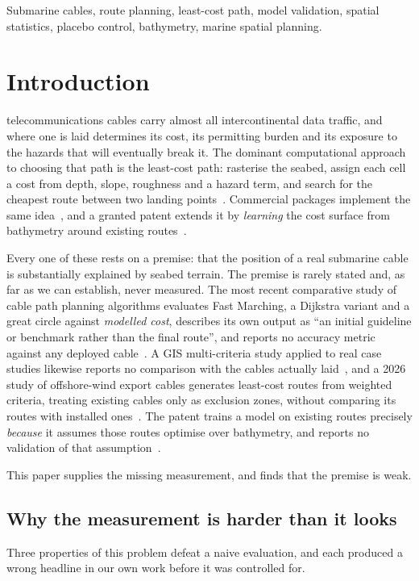\documentclass[journal]{IEEEtran}
\begin{document}
\begin{IEEEkeywords}
Submarine cables, route planning, least-cost path, model validation, spatial
statistics, placebo control, bathymetry, marine spatial planning.
\end{IEEEkeywords}

\section{Introduction}
 telecommunications cables carry almost all
intercontinental data traffic, and where one is laid determines its cost, its
permitting burden and its exposure to the hazards that will eventually break
it. The dominant computational approach to choosing that path is the
least-cost path: rasterise the seabed, assign each cell a cost from depth,
slope, roughness and a hazard term, and search for the cheapest route between
two landing points~\cite{wang2019cost,wang2018fastmarching,makrakis2023gis,
wang2020trunkbranch}. Commercial packages implement the same
idea~\cite{makaiplan}, and a granted patent extends it by \emph{learning} the
cost surface from bathymetry around existing routes~\cite{google_patent_2021}.

Every one of these rests on a premise: that the position of a real submarine
cable is substantially explained by seabed terrain. The premise is rarely
stated and, as far as we can establish, never measured. The most recent
comparative study of cable path planning algorithms evaluates Fast Marching, a
Dijkstra variant and a great circle against \emph{modelled cost}, describes its
own output as ``an initial guideline or benchmark rather than the final
route'', and reports no accuracy metric against any deployed
cable~\cite{wang2024evaluating}. A GIS multi-criteria study applied to real
case studies likewise reports no comparison with the cables actually
laid~\cite{makrakis2023gis}, and a 2026 study of offshore-wind export cables
generates least-cost routes from weighted criteria, treating existing cables
only as exclusion zones, without comparing its routes with installed
ones~\cite{walsh2026owf}. The patent trains a model on existing routes
precisely \emph{because} it assumes those routes optimise over bathymetry, and
reports no validation of that assumption~\cite{google_patent_2021}.

This paper supplies the missing measurement, and finds that the premise is
weak.

\subsection{Why the measurement is harder than it looks}
Three properties of this problem defeat a naive evaluation, and each produced a
wrong headline in our own work before it was controlled for.
\end{document}
